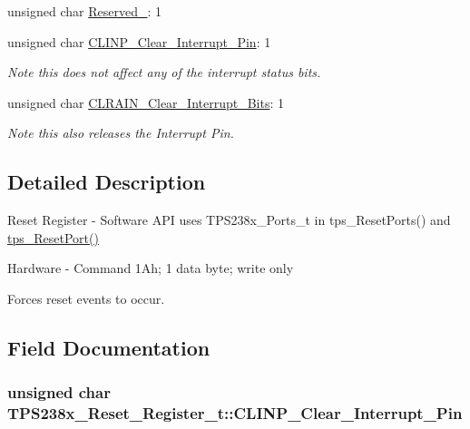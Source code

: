 \begin{DoxyCompactItemize}
unsigned char \hyperlink{struct_t_p_s238x___reset___register__t_af7fd9450f6fa5ef01b577d6be2d6a81d}{Reserved\-\_}\-: 1
\item 
unsigned char \hyperlink{struct_t_p_s238x___reset___register__t_a549bf7bbecaa4cde4bd183948a6580a6}{C\-L\-I\-N\-P\-\_\-\-Clear\-\_\-\-Interrupt\-\_\-\-Pin}\-: 1
\begin{DoxyCompactList}\small\item\em Note this does not affect any of the interrupt status bits. \end{DoxyCompactList}\item 
unsigned char \hyperlink{struct_t_p_s238x___reset___register__t_ab752db3abb368003735ed08064993e74}{C\-L\-R\-A\-I\-N\-\_\-\-Clear\-\_\-\-Interrupt\-\_\-\-Bits}\-: 1
\begin{DoxyCompactList}\small\item\em Note this also releases the Interrupt Pin. \end{DoxyCompactList}\end{DoxyCompactItemize}


\subsection{Detailed Description}
Reset Register -\/ Software A\-P\-I uses T\-P\-S238x\-\_\-\-Ports\-\_\-t in tps\-\_\-\-Reset\-Ports() and \hyperlink{_t_p_s23861_8c_a67d54410671804cb8499e86fd091aac7}{tps\-\_\-\-Reset\-Port()}\par
 Hardware -\/ Command 1\-Ah; 1 data byte; write only \par
\par
 Forces reset events to occur. 

\subsection{Field Documentation}
\hypertarget{struct_t_p_s238x___reset___register__t_a549bf7bbecaa4cde4bd183948a6580a6}{
\subsubsection[{C\-L\-I\-N\-P\-\_\-\-Clear\-\_\-\-Interrupt\-\_\-\-Pin}]{\setlength{\rightskip}{0pt plus 5cm}unsigned char T\-P\-S238x\-\_\-\-Reset\-\_\-\-Register\-\_\-t\-::\-C\-L\-I\-N\-P\-\_\-\-Clear\-\_\-\-Interrupt\-\_\-\-Pin}}\label{struct_t_p_s238x___reset___register__t_a549bf7bbecaa4cde4bd183948a6580a6}


